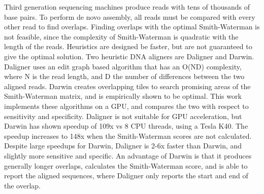 
Third generation sequencing machines produce reads with tens of thousands of base pairs.
To perform de novo assembly, all reads must be compared with every other read to find overlaps.
Finding overlaps with the optimal Smith-Waterman is not feasible, since the complexity of Smith-Waterman is quadratic with the length of the reads.
Heuristics are designed be faster, but are not guaranteed to give the optimal solution.
Two heuristic DNA aligners are Daligner and Darwin.
Daligner uses an edit graph based algorithm that has an O(ND) complexity, where N is the read length, and D the number of differences between the two aligned reads.
Darwin creates overlapping tiles to search promising areas of the Smith-Waterman matrix, and is empirically shown to be optimal.
This work implements these algorithms on a GPU, and compares the two with respect to sensitivity and specificity.
Daligner is not suitable for GPU acceleration, but Darwin has shown speedup of 109x vs 8 CPU threads, using a Tesla K40.
The speedup increases to 148x when the Smith-Waterman scores are not calculated.
Despite large speedups for Darwin, Daligner is 2-6x faster than Darwin, and slightly more sensitive and specific.
An advantage of Darwin is that it produces generally longer overlaps, calculates the Smith-Waterman score, and is able to report the aligned sequences, where Daligner only reports the start and end of the overlap.






